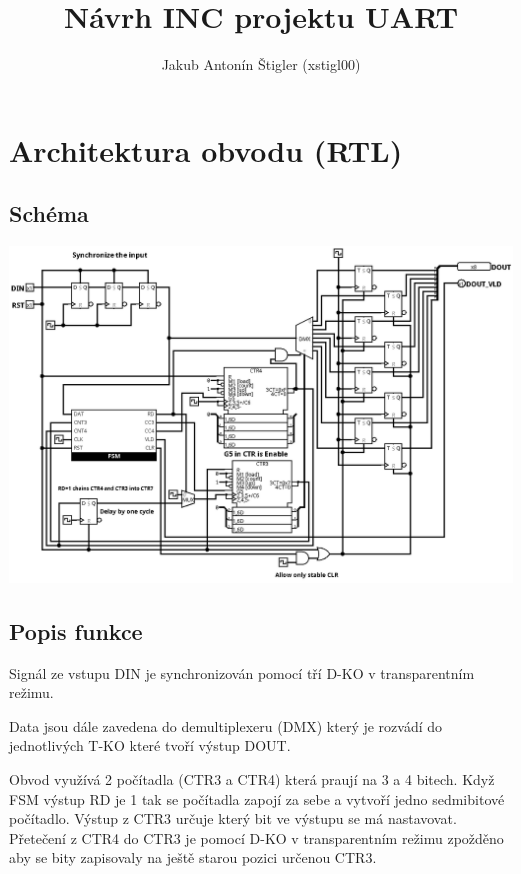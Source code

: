 \documentclass{article}
\title{Návrh INC projektu UART}
\author{Jakub Antonín Štigler (xstigl00)}
\begin{document}
\maketitle


\section{Architektura obvodu (RTL)}

\subsection{Schéma}
\includegraphics*[scale=0.4]{assets/RTL.png}

\subsection{Popis funkce}

Signál ze vstupu DIN je synchronizován pomocí tří D-KO v transparentním režimu.

Data jsou dále zavedena do demultiplexeru (DMX) který je rozvádí do
jednotlivých T-KO které tvoří výstup DOUT.

Obvod využívá 2 počítadla (CTR3 a CTR4) která praují na 3 a 4 bitech.
Když FSM výstup RD je 1 tak se počítadla zapojí za sebe a vytvoří jedno
sedmibitové počítadlo. Výstup z CTR3 určuje který bit ve výstupu se má
nastavovat. Přetečení z CTR4 do CTR3 je pomocí D-KO v transparentním režimu
zpožděno aby se bity zapisovaly na ještě starou pozici určenou CTR3.
\end{document}
